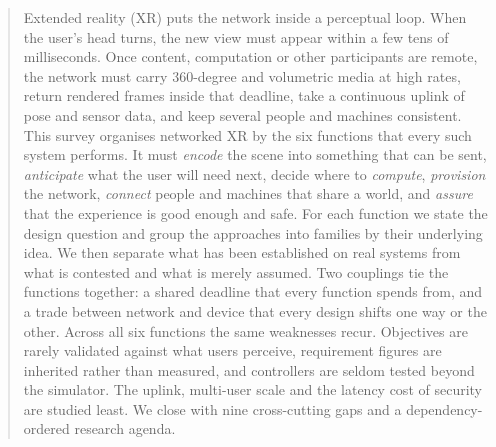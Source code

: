 \begin{abstract}
Extended reality (XR) puts the network inside a perceptual loop. When the user's head turns, the new view
must appear within a few tens of milliseconds. Once content, computation or other participants are
remote, the network must carry 360-degree and volumetric media at high rates, return rendered frames
inside that deadline, take a continuous uplink of pose and sensor data, and keep several people and
machines consistent. This survey organises networked XR by the six functions that every such system
performs. It must \emph{encode} the scene into something that can be sent, \emph{anticipate} what the
user will need next, decide where to \emph{compute}, \emph{provision} the network, \emph{connect} people
and machines that share a world, and \emph{assure} that the experience is good enough and safe. For each
function we state the design question and group the approaches into families by their underlying idea.
We then separate what has been established on real systems from what is contested and what is merely
assumed. Two couplings tie the functions together: a shared deadline that every function spends from,
and a trade between network and device that every design shifts one way or the other. Across all six
functions the same weaknesses recur. Objectives are rarely validated against what users perceive,
requirement figures are inherited rather than measured, and controllers are seldom tested beyond the
simulator. The uplink, multi-user scale and the latency cost of security are studied least. We close
with nine cross-cutting gaps and a dependency-ordered research agenda.
\end{abstract}
